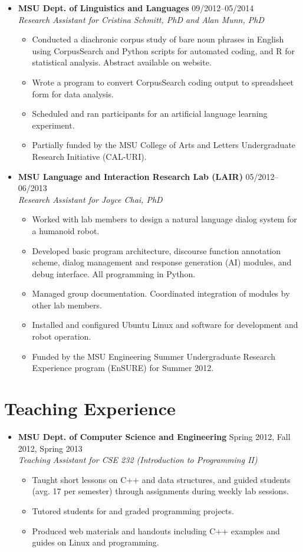 \documentclass[10pt,oneside]{article}
\newcommand{\ressection}[1]{
	\vspace{-12pt}
	\section*{#1}
}
\newcommand{\resbigitem}[4]{
	\item
	\textbf{#1} \hfill #2 \\
	\textit{#3} \hfill \textit{#4}
}
\begin{document}
\begin{itemize}
	\resbigitem{MSU Dept. of Linguistics and Languages}
		{09/2012--05/2014}
		{Research Assistant for Cristina Schmitt, PhD and Alan Munn, PhD}
		{}
	\begin{itemize}
		\item{Conducted a diachronic corpus study of bare noun phrases in English using CorpusSearch and Python scripts for automated coding, and R for statistical analysis. Abstract available on website.}
		\item{Wrote a program to convert CorpusSearch coding output to spreadsheet form for data analysis.}
		\item{Scheduled and ran participants for an artificial language learning experiment.}
		\item{Partially funded by the MSU College of Arts and Letters Undergraduate Research Initiative (CAL-URI).}
	\end{itemize}
	
	\resbigitem{MSU Language and Interaction Research Lab (LAIR)}
		{05/2012--06/2013}
		{Research Assistant for Joyce Chai, PhD}
		{}
	\begin{itemize}
		\item{Worked with lab members to design a natural language dialog system for a humanoid robot.}
		\item{Developed basic program architecture, discourse function annotation scheme, dialog management and response generation (AI) modules, and debug interface. All programming in Python.}
		\item{Managed group documentation. Coordinated integration of modules by other lab members.}
		\item{Installed and configured Ubuntu Linux and software for development and robot operation.}
		\item{Funded by the MSU Engineering Summer Undergraduate Research Experience program (EnSURE) for Summer 2012.}
	\end{itemize}
\end{itemize}


\ressection{Teaching Experience}

\begin{itemize}
	\resbigitem{MSU Dept. of Computer Science and Engineering}
		{Spring 2012, Fall 2012, Spring 2013}
		{Teaching Assistant for CSE 232 (Introduction to Programming II)}
		{}
	\begin{itemize}
		\item{Taught short lessons on C++ and data structures, and guided students (avg. 17 per semester) through assignments during weekly lab sessions.}
		\item{Tutored students for and graded programming projects.}
		\item{Produced web materials and handouts including C++ examples and guides on Linux and programming.}
	\end{itemize}
\end{itemize}
\end{document}
